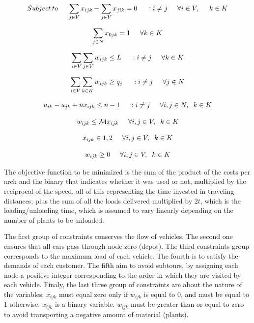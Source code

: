 \documentclass{amsart}
\begin{document}
        $$Subject\hspace{0.07cm} to \hspace{0.5cm} \sum_{j \in V} x_{ijk} - \sum_{j \in V} x_{jik} = 0 \hspace{0.5cm} : i \neq j \hspace{0.5cm} \forall i \in V, \hspace{0.5cm} k \in K$$

        $$\sum_{j \in N} x_{0jk} = 1 \hspace{0.5cm} \forall k \in K$$

        $$ \sum_{i \in V} \sum_{j \in V} w_{ijk} \leq L \hspace{0.5cm} : i \neq j \hspace{0.5cm} \forall k \in K$$

        $$ \sum_{i \in V} \sum_{k \in K} w_{ijk} \geq q_j \hspace{0.5cm} : i \neq j \hspace{0.5cm} \forall j \in N$$

        $$u_{ik} - u_{jk} + n x_{ijk} \leq n - 1 \hspace{0.5cm} : i \neq j \hspace{0.5cm} \forall i,j \in N, \hspace{0.2cm} k \in K$$

        $$w_{ijk} \leq \mathcal{M} x_{ijk} \hspace{0.5cm} \forall i,j \in V, \hspace{0.2cm} k \in K$$

        $$x_{ijk} \in {1, 2} \hspace{0.5cm} \forall i,j \in V, \hspace{0.2cm} k \in K$$
        
        $$w_{ijk} \geq 0 \hspace{0.5cm} \forall i,j \in V, \hspace{0.2cm} k \in K$$
        
        
        \vspace{0.4cm}
        The objective function to be minimized is the sum of the product of the costs per arch and the binary that indicates whether it was used or not, multiplied by the reciprocal of the speed, all of this representing the time invested in traveling distances; plus the sum of all the loads delivered multiplied by $2t$, which is the loading/unloading time, which is assumed to vary linearly depending on the number of plants to be unloaded. 
        
        
        The first group of constraints conserves the flow of vehicles. The second one ensures that all cars pass through node zero (depot). The third constraints group corresponds to the maximum load of each vehicle. The fourth is to satisfy the demands of each customer. The fifth aim to avoid subtours, by assigning each node a positive integer corresponding to the order in which they are visited by each vehicle. Finaly, the last three group of constraints are about the nature of the variables: $x_{ijk}$ must equal zero only if $w_{ijk}$ is equal to $0$, and must be equal to $1$ otherwise. $x_{ijk}$ is a binary variable. $w_{ijk}$ must be greater than or equal to zero to avoid transporting a negative amount of material (plants).
\end{document}
